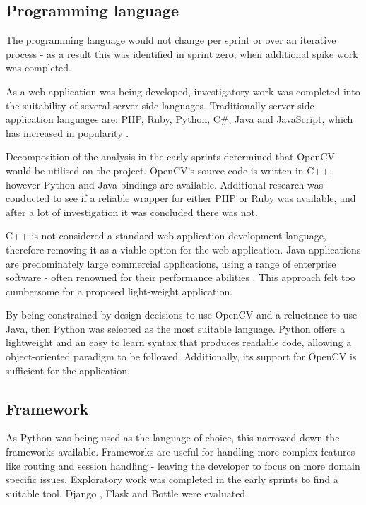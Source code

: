 \subsection{Programming language}
The programming language would not change per sprint or over an iterative process - as a result this was identified in sprint zero, when additional spike work was completed.

As a web application was being developed, investigatory work was completed into the suitability of several server-side languages. Traditionally server-side application languages are: PHP, Ruby, Python, C\#, Java and JavaScript, which has increased in popularity \cite{citeulike:14018462}.

Decomposition of the analysis in the early sprints determined that OpenCV would be utilised on the project. OpenCV's source code is written in C++, however Python and Java bindings are available. Additional research was conducted to see if a reliable wrapper for either PHP or Ruby was available, and after a lot of investigation it was concluded there was not.

C++ is not considered a standard web application development language,  therefore removing it as a viable option for the web application. Java applications are predominately large commercial applications, using a range of enterprise software - often renowned for their performance abilities \cite{citeulike:14019744}. This approach felt too cumbersome for a proposed light-weight application.

By being constrained by design decisions to use OpenCV and a reluctance to use Java, then Python was selected as the most suitable language. Python offers a lightweight and an easy to learn syntax that produces readable code, allowing a object-oriented paradigm to be followed. Additionally, its support for OpenCV is sufficient for the application.

\subsection{Framework} \label{language:framework}
As Python was being used as the language of choice, this narrowed down the frameworks available. Frameworks are useful for handling more complex features like routing and session handling - leaving the developer to focus on more domain specific issues.   Exploratory work was completed in the early sprints to find a suitable tool. Django \cite{citeulike:14019784}, Flask \cite{citeulike:13160396} and Bottle \cite{citeulike:14019792} were evaluated.

